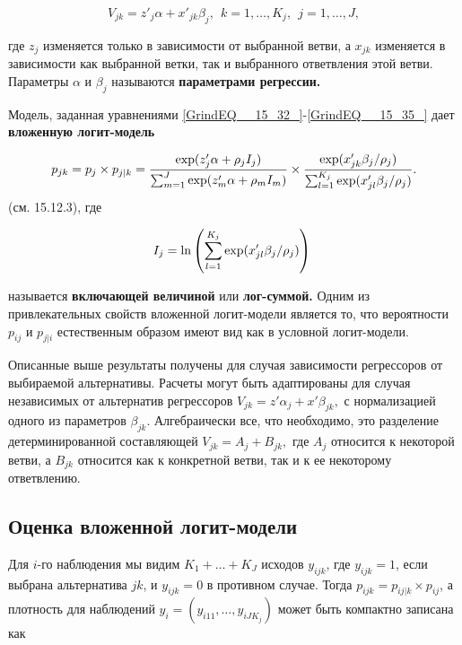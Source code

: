 \begin{equation} \label{GrindEQ__15_35_} V_{jk}=z'_j\alpha +x'_{jk}{\beta }_j,\ \ k=1,\dots ,K_j,\ \ j=1,\dots ,J, \end{equation} 

где $z_j$ изменяется только в зависимости от выбранной ветви, а $x_{jk}$ изменяется в зависимости как выбранной ветки, так и выбранного ответвления этой ветви. Параметры $\alpha $ и ${\beta }_j$ называются \textbf{параметрами регрессии.}

Модель, заданная уравнениями \eqref{GrindEQ__15_32_}-\eqref{GrindEQ__15_35_} дает \textbf{вложенную логит-модель}

\begin{equation} 
\label{GrindEQ__15_36_} 
p_{jk}=
p_j\times p_{j|k}=
\frac{{\rm exp}(z'_j\alpha +{\rho }_jI_j)}{\sum^J_{m=1}{{\rm exp}(z'_m\alpha +{\rho }_mI_m)}}
\times 
\frac{{\rm exp}(x'_{jk}{\beta }_j/{\rho }_j)}{\sum^{K_j}_{l=1}{{\rm exp}(x'_{jl}{\beta }_j/{\rho }_j)}}. 
\end{equation} 
(см.  15.12.3), где

\begin{equation} \label{GrindEQ__15_37_} I_j={\ln  \left(\sum^{K_j}_{l=1}{{\rm exp}(x'_{jl}{\beta }_j/{\rho }_j)}\right)\ } \end{equation} 

называется \textbf{включающей величиной }или \textbf{лог-суммой. } Одним из привлекательных свойств вложенной логит-модели является то, что вероятности $p_{ij}$ и $p_{j|i}$ естественным образом имеют вид как в условной логит-модели.

Описанные выше результаты получены для случая зависимости регрессоров от выбираемой альтернативы. Расчеты могут быть адаптированы для случая независимых от альтернатив регрессоров $V_{jk}=z'{\alpha }_j+x'{\beta }_{jk},$ с нормализацией одного из параметров ${\beta }_{jk}$. Алгебраически все, что необходимо, это разделение детерминированной составляющей $V_{jk}=A_j+B_{jk},$ где $A_j$ относится к некоторой ветви, а $B_{jk}$ относится как к конкретной ветви, так и к ее некоторому ответвлению.

\subsection{Оценка вложенной логит-модели}

Для $i$-го наблюдения мы видим $K_1+\dots +K_J$ исходов $y_{ijk}$, где $y_{ijk}=1$, если выбрана альтернатива $jk$, и $y_{ijk}=0$ в противном случае. Тогда $p_{ijk}=p_{ij|k}\times p_{ij}$, а плотность  для наблюдений $y_i=(y_{i11},\dots ,y_{iJK_j})$ может быть компактно записана как

